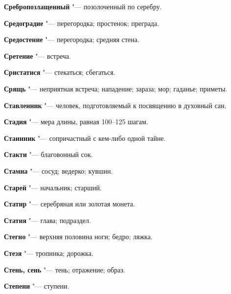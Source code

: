 \begin{mymulticols}{2}
\noindent\textbf{Сребропозлащенный} "--- позолоченный по серебру. 




\noindent\textbf{Средоградие} "--- перегородка; простенок; преграда. 




\noindent\textbf{Средостение} "--- перегородка; средняя стена. 




\noindent\textbf{Сретение} "--- встреча. 




\noindent\textbf{Сристатися} "--- стекаться; сбегаться. 




\noindent\textbf{Срящь} "--- неприятная встреча; нападение; зараза; мор; гаданье; приметы. 




\noindent\textbf{Ставленник} "--- человек, подготовляемый к посвящению в духовный сан. 




\noindent\textbf{Стадия} "--- мера длины, равная 100--125 шагам. 




\noindent\textbf{Стаинник} "--- сопричастный с кем-либо одной тайне. 




\noindent\textbf{Стакти} "--- благовонный сок. 




\noindent\textbf{Стамна} "--- сосуд; ведерко; кувшин. 




\noindent\textbf{Старей} "--- начальник; старший. 




\noindent\textbf{Статир} "--- серебряная или золотая монета. 




\noindent\textbf{Статия} "--- глава; подраздел. 




\noindent\textbf{Стегно} "--- верхняя половина ноги; бедро; ляжка. 




\noindent\textbf{Стезя} "--- тропинка; дорожка. 




\noindent\textbf{Стень, сень} "--- тень; отражение; образ. 




\noindent\textbf{Степени} "--- ступени. 





\end{mymulticols}
